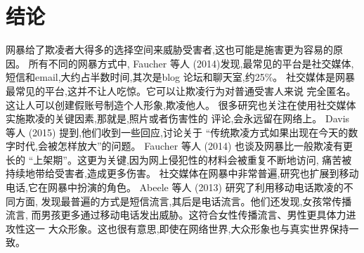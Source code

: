 \documentclass[a4paper]{article}
\begin{document}
\section{结论}
网暴给了欺凌者大得多的选择空间来威胁受害者,这也可能是施害更为容易的原因。
所有不同的网暴方式中,
Faucher 等人 (2014)\cite{faucher2014}发现,最常见的平台是社交媒体,
短信和email,大约占半数时间,其次是blog 论坛和聊天室,约25\%。
社交媒体是网暴最常见的平台,这并不让人吃惊。它可以让欺凌行为对普通受害人来说
完全匿名。这让人可以创建假账号制造个人形象,欺凌他人。
很多研究也关注在使用社交媒体实施欺凌的关键因素,那就是,照片或者伤害性的
评论,会永远留在网络上。
Davis 等人 (2015)\cite{davis2015} 提到,他们收到一些回应,讨论关于
``传统欺凌方式如果出现在今天的数字时代,会被怎样放大''的问题。
Faucher 等人 (2014)\cite{faucher2014} 也谈及网暴比一般欺凌有更长的
``上架期''。这更为关键,因为网上侵犯性的材料会被重复不断地访问,
痛苦被持续地带给受害者,造成更多伤害。
社交媒体在网暴中非常普遍,研究也扩展到移动电话,它在网暴中扮演的角色。
Abeele 等人 (2013)\cite{abeele2013} 研究了利用移动电话欺凌的不同方面,
发现最普遍的方式是短信流言,其后是电话流言。他们还发现,女孩常传播流言,
而男孩更多通过移动电话发出威胁。这符合女性传播流言、男性更具体力进攻性这一
大众形象。这也很有意思,即使在网络世界,大众形象也与真实世界保持一致。




\end{document}

